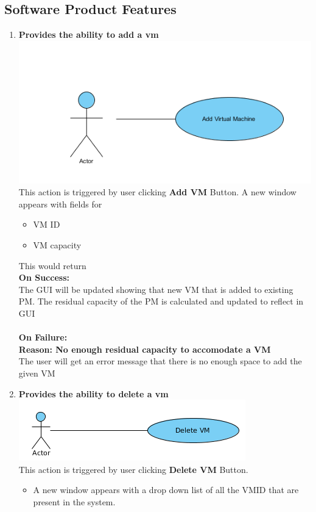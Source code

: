 \documentclass[a4paper,11pt]{article}
\begin{document}
		\subsection{Software Product Features}
			\begin{enumerate}
				\item {\bf Provides the ability to add a vm} \\
 				\includegraphics{images/usecase}
				\\This action is triggered by user clicking {\bf Add VM } Button. A new window appears with fields for  
				\begin{itemize}
				 \item VM ID
				 \item VM capacity
				\end{itemize}
				
				This would return \\
				{\bf On Success: }\\
				The GUI will be updated showing that new  VM that is added to existing PM.
				The residual capacity of the PM is calculated and updated to reflect in GUI\\\\
				{\bf On Failure: } \\
				{\bf Reason: No enough residual capacity to accomodate a VM}\\
				The user will get an error message that there is no enough space to add the given VM\\
				
				\item {\bf Provides the ability to delete a vm}\\
				\includegraphics{images/delete}
				\\This action is triggered by user clicking {\bf Delete VM } Button. 
				\begin{itemize}
				 \item A new window appears with a drop down list of all the VM\textunderscore ID  that are 
				 present in the system.
				\end{itemize}
				

\end{enumerate}
\end{document}
